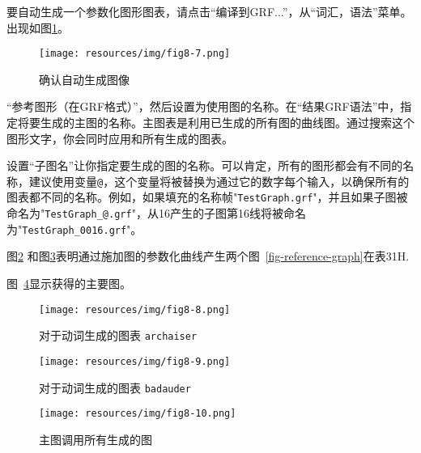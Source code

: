 \bigskip
\noindent  要自动生成一个参数化图形图表，请点击“编译到GRF...”，从“词汇，语法”菜单。出现如图\ref{fig-configuration-graph-generation}。

\begin{figure}[!h]
\begin{center}
\texttt{[image: resources/img/fig8-7.png]}
\caption{确认自动生成图像\label{fig-configuration-graph-generation}}
\end{center}
\end{figure}

\bigskip
{}“参考图形（在GRF格式）”，然后设置为使用图的名称。在“结果GRF语法”中，指定将要生成的主图的名称。主图表是利用已生成的所有图的曲线图。通过搜索这个图形文字，你会同时应用和所有生成的图表。


\bigskip
\noindent  设置“子图名”让你指定要生成的图的名称。可以肯定，所有的图形都会有不同的名称，建议使用变量\verb+@+，这个变量将被替换为通过它的数字每个输入，以确保所有的图表都不同的名称。例如，如果填充的名称帧"\verb+TestGraph.grf+"，并且如果子图被命名为"\verb+TestGraph_@.grf+"，从16产生的子图第16线将被命名为"\verb+TestGraph_0016.grf+"。

\bigskip
\noindent 图\ref{fig-archaiser} 和图\ref{fig-badauder}表明通过施加图的参数化曲线产生两个图~\ref{fig-reference-graph}在表31H.

\bigskip
\noindent 图~\ref{fig-main-graph}显示获得的主要图。

\begin{figure}[!h]
\begin{center}
\texttt{[image: resources/img/fig8-8.png]}
\caption{对于动词生成的图表
\texttt{archaiser}\label{fig-archaiser}}
\end{center}
\end{figure}

\begin{figure}[!h]
\begin{center}
\texttt{[image: resources/img/fig8-9.png]}
\caption{对于动词生成的图表 \texttt{badauder}\label{fig-badauder}}
\end{center}
\end{figure}

\begin{figure}[!h]
\begin{center}
\texttt{[image: resources/img/fig8-10.png]}
\caption{主图调用所有生成的图\label{fig-main-graph}}
\end{center}
\end{figure}



